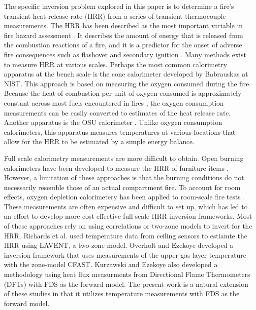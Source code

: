 \documentclass{article}
\begin{document}
The specific inversion problem explored in this paper is to determine a fire's transient heat release rate (HRR) from a series of transient thermocouple measurements. The HRR has been described as the most important variable in fire hazard assessment \cite{babrauskas1992heat}. It describes the amount of energy that is released from the combustion reactions of a fire, and it is a predictor for the onset of adverse fire consequences such as flashover \cite{mccaffrey1981estimating} and secondary ignition \cite{jahn2008effect}. Many methods exist to measure HRR at various scales. Perhaps the most common calorimetry apparatus at the bench scale is the cone calorimeter \cite{babrauskas1984development} developed by Babrauskas at NIST. This approach is based on measuring the oxygen consumed during the fire. Because the heat of combustion per unit of oxygen consumed is approximately constant across most fuels encountered in fires \cite{huggett1980estimation}, the oxygen consumption measurements can be easily converted to estimates of the heat release rate. Another apparatus is the OSU calorimeter \cite{smith1996heat}. Unlike oxygen consumption calorimeters, this apparatus measures temperatures at various locations that allow for the HRR to be estimated by a simple energy balance. 

Full scale calorimetry measurements are more difficult to obtain. Open burning calorimeters have been developed to measure the HRR of furniture items \cite{babrauskas1982upholstered}. However, a limitation of these approaches is that the burning conditions do not necessarily resemble those of an actual compartment fire. To account for room effects, oxygen depletion calorimetery has been applied to room-scale fire tests \cite{abecassis2008characterisation}. These measurements are often expensive and difficult to set up, which has led to an effort to develop more cost effective full scale HRR inversion frameworks. Most of these approaches rely on using correlations or two-zone models to invert for the HRR. Richards et al. \cite{richards1997fire} used temperature data from ceiling sensors to estiamte the HRR using LAVENT, a two-zone model. Overholt and Ezekoye \cite{overholt2012characterizing} developed a inversion framework that uses measurements of the upper gas layer temperature with the zone-model CFAST. Kurzawski and Ezekoye also developed a methodology using heat flux measurments from Directional Flame Thermometers (DFTs) with FDS as the forward model. The present work is a natural extension of these studies in that it utilizes temperature measurements with FDS as the forward model. 
\end{document}
